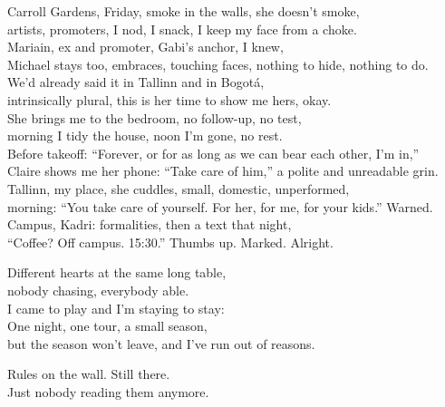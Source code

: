 \begin{lyrics}
Carroll Gardens, Friday, smoke in the walls, she doesn’t smoke,\\
artists, promoters, I nod, I snack, I keep my face from a choke.\\
Mariain, ex and promoter, Gabi’s anchor, I knew,\\
Michael stays too, embraces, touching faces, nothing to hide, nothing to do.\\
We’d already said it in Tallinn and in Bogotá,\\
intrinsically plural, this is her time to show me hers, okay.\\
She brings me to the bedroom, no follow-up, no test,\\
morning I tidy the house, noon I’m gone, no rest.\\
Before takeoff: “Forever, or for as long as we can bear each other, I’m in,”\\
Claire shows me her phone: “Take care of him,” a polite and unreadable grin.\\
Tallinn, my place, she cuddles, small, domestic, unperformed,\\
morning: “You take care of yourself. For her, for me, for your kids.” Warned.\\
Campus, Kadri: formalities, then a text that night,\\
“Coffee? Off campus. 15:30.” Thumbs up. Marked. Alright.

Different hearts at the same long table,\\
nobody chasing, everybody able.\\
I came to play and I’m staying to stay:\\
One night, one tour, a small season,\\
but the season won’t leave, and I’ve run out of reasons.

Rules on the wall. Still there.\\
Just nobody reading them anymore.
\end{lyrics}

